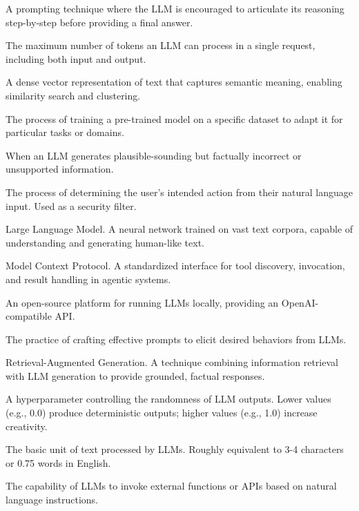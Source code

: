 \begin{description}[style=nextline,leftmargin=2cm,labelwidth=1.8cm]

\item[Chain-of-Thought (CoT)]
A prompting technique where the LLM is encouraged to articulate its reasoning step-by-step before providing a final answer.

\item[Context Window]
The maximum number of tokens an LLM can process in a single request, including both input and output.

\item[Embedding]
A dense vector representation of text that captures semantic meaning, enabling similarity search and clustering.

\item[Fine-tuning]
The process of training a pre-trained model on a specific dataset to adapt it for particular tasks or domains.

\item[Hallucination]
When an LLM generates plausible-sounding but factually incorrect or unsupported information.

\item[Intent Classification]
The process of determining the user's intended action from their natural language input. Used as a security filter.

\item[LLM]
Large Language Model. A neural network trained on vast text corpora, capable of understanding and generating human-like text.

\item[MCP]
Model Context Protocol. A standardized interface for tool discovery, invocation, and result handling in agentic systems.

\item[Ollama]
An open-source platform for running LLMs locally, providing an OpenAI-compatible API.

\item[Prompt Engineering]
The practice of crafting effective prompts to elicit desired behaviors from LLMs.

\item[RAG]
Retrieval-Augmented Generation. A technique combining information retrieval with LLM generation to provide grounded, factual responses.

\item[Temperature]
A hyperparameter controlling the randomness of LLM outputs. Lower values (e.g., 0.0) produce deterministic outputs; higher values (e.g., 1.0) increase creativity.

\item[Token]
The basic unit of text processed by LLMs. Roughly equivalent to 3-4 characters or 0.75 words in English.

\item[Tool Calling]
The capability of LLMs to invoke external functions or APIs based on natural language instructions.

\end{description}

